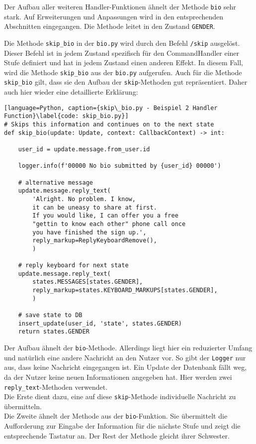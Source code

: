                 Der Aufbau aller weiteren Handler-Funktionen ähnelt der Methode \verb|bio| sehr stark. Auf Erweiterungen und Anpassungen wird in den entsprechenden Abschnitten eingegangen. Die Methode leitet in den Zustand \verb|GENDER|.

                Die Methode \verb|skip_bio| in der \verb|bio.py| wird durch den Befehl \verb|/skip| ausgelöst. Dieser Befehl ist in jedem Zustand spezifisch für den CommandHandler einer Stufe definiert und hat in jedem Zustand einen anderen Effekt. In diesem Fall, wird die Methode \verb|skip_bio| aus der \verb|bio.py| aufgerufen. Auch für die Methode \verb|skip_bio| gilt, dass sie den Aufbau der \verb|skip|-Methoden gut repräsentiert. Daher auch hier wieder eine detaillierte Erklärung:

                \begin{lstlisting}[language=Python, caption={skip\_bio.py - Beispiel 2 Handler Function}\label{code: skip_bio.py}]
# Skips this information and continues on to the next state
def skip_bio(update: Update, context: CallbackContext) -> int:
    
    user_id = update.message.from_user.id

    logger.info(f'00000 No bio submitted by {user_id} 00000')

    # alternative message
    update.message.reply_text(
        'Alright. No problem. I know, 
        it can be uneasy to share at first. 
        If you would like, I can offer you a free 
        "gettin to know each other" phone call once 
        you have finished the sign up.',
        reply_markup=ReplyKeyboardRemove(),
        )

    # reply keyboard for next state
    update.message.reply_text(
        states.MESSAGES[states.GENDER],
        reply_markup=states.KEYBOARD_MARKUPS[states.GENDER],
        )    

    # save state to DB
    insert_update(user_id, 'state', states.GENDER)
    return states.GENDER
                \end{lstlisting}


                Der Aufbau ähnelt der \verb|bio|-Methode. Allerdings liegt hier ein reduzierter Umfang und natürlich eine andere Nachricht an den Nutzer vor. So gibt der \verb|Logger| nur aus, dass keine Nachricht eingegangen ist. Ein Update der Datenbank fällt weg, da der Nutzer keine neuen Informationen angegeben hat. Hier werden zwei \verb|reply_text|-Methoden verwendet. \\
                Die Erste dient dazu, eine auf diese \verb|skip|-Methode individuelle Nachricht zu übermitteln. \\
                Die Zweite ähnelt der Methode aus der \verb|bio|-Funktion. Sie übermittelt die Aufforderung zur Eingabe der Information für die nächste Stufe und zeigt die entsprechende Tastatur an. Der Rest der Methode gleicht ihrer Schwester.


